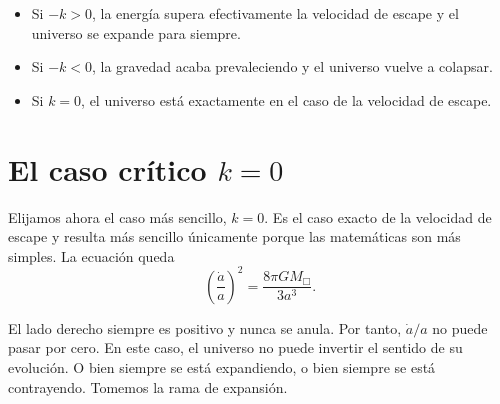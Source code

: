 \begin{itemize}
\item Si \(-k>0\), la energía supera efectivamente la velocidad de escape y el universo se expande para siempre.
\item Si \(-k<0\), la gravedad acaba prevaleciendo y el universo vuelve a colapsar.
\item Si \(k=0\), el universo está exactamente en el caso de la velocidad de escape.
\end{itemize}

\begin{classroomqa}
\end{classroomqa}

\section{El caso crítico \(k=0\)}

Elijamos ahora el caso más sencillo, \(k=0\). Es el caso exacto de la velocidad de escape y resulta más sencillo únicamente porque las matemáticas son más simples. La ecuación queda
\begin{equation}
\left(\frac{\dot a}{a}\right)^2=\frac{8\pi G M_{\Box}}{3a^3}.
\end{equation}

El lado derecho siempre es positivo y nunca se anula. Por tanto, \(\dot a/a\) no puede pasar por cero. En este caso, el universo no puede invertir el sentido de su evolución. O bien siempre se está expandiendo, o bien siempre se está contrayendo. Tomemos la rama de expansión.

